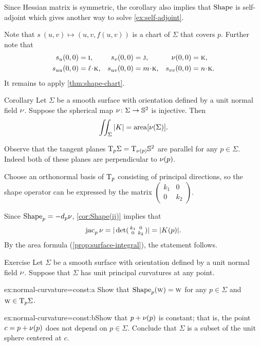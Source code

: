 Since Hessian matrix is symmetric, the corollary also implies that $\mathop{\rm Shape}\nolimits$ is self-adjoint which gives another way to solve \ref{ex:self-adjoint}.

Note that $s\:(u,v)\mapsto (u,v,f(u,v))$ is a chart of $\Sigma$ that covers $p$.
Further note that 
\begin{align*}
s_u(0,0)&=\vec i,
&
s_v(0,0)&=\vec j,
&
\Norm(0,0)&=\vec k,
\\
s_{uu}(0,0)&=\ell\cdot \vec k,
&
s_{uv}(0,0)&=m\cdot \vec k,
&
s_{vv}(0,0)&=n\cdot \vec k.
\end{align*}
It remains to apply \ref{thm:shape-chart}.
\qeds

\begin{thm}{Corollary}\label{cor:intK}
Let $\Sigma$ be a smooth surface with orientation defined by a unit normal field $\nu$.
Suppose the spherical map $\nu\colon\Sigma\to\mathbb{S}^2$ is injective.
Then 
\[\iint_\Sigma|K|=\mathop{\rm area}\nolimits[\nu(\Sigma)].\]
\end{thm}

Observe that the tangent planes $\mathrm{T}_p\Sigma=\mathrm{T}_{\nu(p)}\mathbb{S}^2$ are parallel for any $p\in\Sigma$.
Indeed both of these planes are perpendicular to $\nu(p)$. 


Choose an orthonormal basis of $\mathrm{T}_p$ consisting of principal directions,
so the shape operator can be expressed by the matrix 
$(\begin{smallmatrix}
   k_1
   &0
   \\
   0
   &k_2
  \end{smallmatrix})$.

Since $\mathop{\rm Shape}\nolimits_p=-d_p\nu$, \ref{cor:Shape(ij)} implies that
\[\mathop{\rm jac}\nolimits_p\nu=|\det(\begin{smallmatrix}
   k_1
   &0
   \\
   0
   &k_2
  \end{smallmatrix})|=|K(p)|.\]
By the area formula (\ref{prop:surface-integral}), the statement follows.
\qeds


\begin{thm}{Exercise}\label{ex:normal-curvature=const}
Let $\Sigma$ be a smooth surface with orientation defined by a unit normal field $\nu$.
Suppose that $\Sigma$ has unit principal curvatures at any point.

\begin{subthm}{ex:normal-curvature=const:a} Show that $\mathop{\rm Shape}\nolimits_p(\text{\sc{w}})=\text{\sc{w}}$ for any $p\in\Sigma$ and $\text{\sc{w}}\in \mathrm{T}_p\Sigma$.
\end{subthm}

\begin{subthm}{ex:normal-curvature=const:b}Show that $p+\nu(p)$ is constant; that is, the point $c=p+\nu(p)$ does not depend on $p\in\Sigma$.
Conclude that $\Sigma$ is a subset of the unit sphere centered at $c$.
\end{subthm}

\end{thm}

